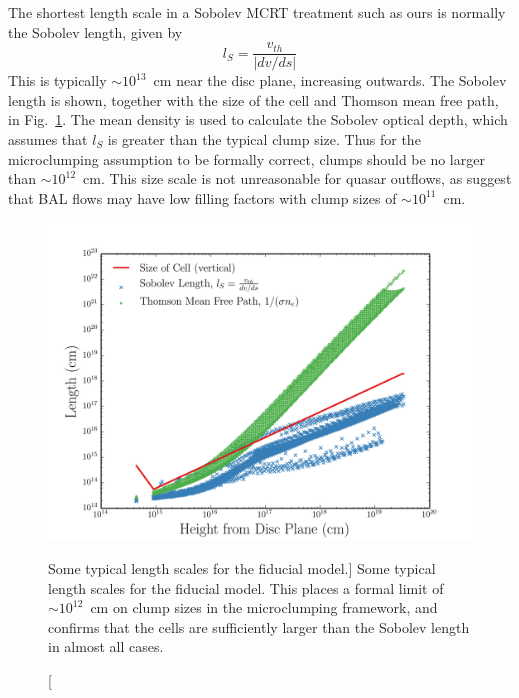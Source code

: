 The shortest length scale in a Sobolev MCRT treatment such as ours 
is normally the Sobolev length, given by
\begin{equation}
l_S = \frac{v_{th}}{| dv/ds |}
\end{equation}
This is typically $\sim10^{13}$~cm near the disc plane, increasing outwards.
The Sobolev length is shown, together with the size of the cell
and Thomson mean free path, in Fig.~\ref{fig:length_scales}.
The mean density is used to calculate the Sobolev optical depth, 
which assumes that
$l_S$ is greater than the typical clump size.
Thus for the microclumping assumption to be formally correct, 
clumps should be no larger than $\sim10^{12}$~cm.
This size scale is not unreasonable for quasar outflows, as
\cite{dekool1995} suggest that BAL flows may have low filling factors with
clump sizes of $\sim10^{11}$~cm.
\begin{figure} 
\centering
\includegraphics[width=1.0\textwidth]{figures/06-agnpaper/size_of_clumps.png}
\caption
[Some typical length scales for the fiducial model.]
{
Some typical length scales for the fiducial model. 
This places a formal limit of $\sim10^{12}$~cm on clump sizes 
in the microclumping framework, and confirms that the cells are sufficiently
larger than the Sobolev length in almost all cases.
}
\label{fig:length_scales}
\end{figure} 

